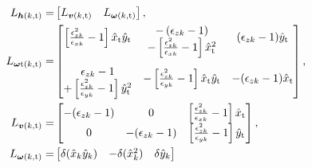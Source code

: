 \documentclass[lettersize,journal]{IEEEtran}
\begin{document}
\begin{align*}
    L_{\boldsymbol{h}(k,\text{t})} =& \begin{bmatrix} L_{\boldsymbol{v}(k,\text{t})} & L_{\boldsymbol{\omega}(k,\text{t})} \end{bmatrix},\\
    L_{\boldsymbol{\omega}\text{t}(k,\text{t})} =& \begin{bmatrix} \multirow{2}{*}{$\left[\frac{\epsilon_{zk}^2}{\epsilon_{xk}} - 1\right] \hat{x}_{\text{t}} \hat{y}_{\text{t}}$} & - \left(\epsilon_{zk} - 1 \right) & \multirow{2}{*}{$(\epsilon_{zk} - 1) \hat{y}_{\text{t}}$} \\ & - \left[\frac{\epsilon_{zk}^2}{\epsilon_{xk}} - 1\right] \hat{x}_{\text{t}}^2 & \\[1.0em] \epsilon_{zk} - 1 & \multirow{2}{*}{$- \left[\frac{\epsilon_{zk}^2}{\epsilon_{yk}} - 1\right] \hat{x}_{\text{t}} \hat{y}_{\text{t}}$} & \multirow{2}{*}{$ - (\epsilon_{zk} - 1) \hat{x}_{\text{t}}$} \\ + \left[\frac{\epsilon_{zk}^2}{\epsilon_{yk}} - 1\right] \hat{y}_{\text{t}}^2 & & \end{bmatrix}, \\
    L_{\boldsymbol{v}(k,\text{t})} =& \begin{bmatrix} - (\epsilon_{zk} - 1) & 0 & \left[\frac{\epsilon_{zk}^2}{\epsilon_{xk}} - 1\right] \hat{x}_{\text{t}} \\ 0 & - (\epsilon_{zk} - 1) & \left[\frac{\epsilon_{zk}^2}{\epsilon_{yk}} - 1\right] \hat{y}_{\text{t}} \end{bmatrix},\\
    L_{\boldsymbol{\omega}(k,\text{t})} =& \begin{bmatrix} \delta (\hat{x}_k \hat{y}_k) & - \delta (\hat{x}_k^2) & \delta \hat{y}_k \\

\end{bmatrix}
\end{align*}
\end{document}

